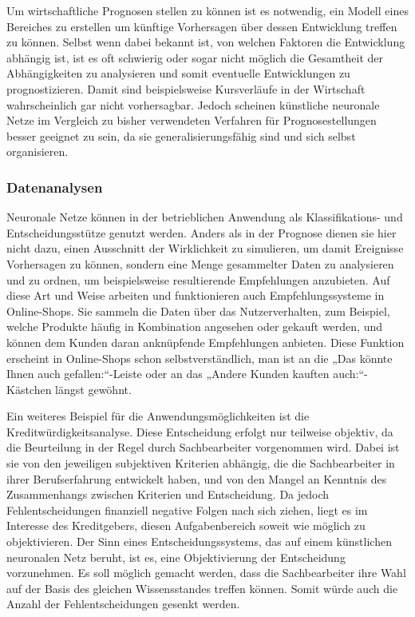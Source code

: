 \documentclass[twoside,a4paper,draft]{article}
\begin{document}
Um wirtschaftliche Prognosen stellen zu können ist es notwendig, ein Modell eines Bereiches zu erstellen um künftige Vorhersagen über dessen Entwicklung treffen zu können. Selbst wenn dabei bekannt ist, von welchen Faktoren die Entwicklung  abhängig ist, ist es oft schwierig oder sogar nicht möglich die Gesamtheit der Abhängigkeiten zu analysieren und somit eventuelle Entwicklungen zu prognostizieren. Damit sind beispielsweise Kursverläufe in der Wirtschaft wahrscheinlich gar nicht vorhersagbar. Jedoch scheinen künstliche neuronale Netze im Vergleich zu bisher verwendeten Verfahren für Prognosestellungen besser geeignet zu sein, da sie generalisierungsfähig sind und sich selbst organisieren.

\subsubsection{Datenanalysen}

Neuronale Netze können in der betrieblichen Anwendung als Klassifikations- und Entscheidungsstütze genutzt werden. Anders als in der Prognose dienen sie hier nicht dazu, einen Ausschnitt der Wirklichkeit zu simulieren, um damit Ereignisse Vorhersagen zu können, sondern eine Menge gesammelter Daten zu analysieren und zu ordnen, um beispielsweise resultierende Empfehlungen anzubieten. Auf diese Art und Weise arbeiten und funktionieren auch Empfehlungssysteme in Online-Shops. Sie sammeln die Daten über das Nutzerverhalten, zum Beispiel, welche Produkte häufig in Kombination angesehen oder gekauft werden, und können dem Kunden daran anknüpfende Empfehlungen anbieten. Diese Funktion erscheint in Online-Shops schon selbstverständlich, man ist an die „Das könnte Ihnen auch gefallen:“-Leiste oder an das „Andere Kunden kauften auch:“-Kästchen längst gewöhnt.

Ein weiteres Beispiel für die Anwendungsmöglichkeiten ist die Kreditwürdigkeitsanalyse. Diese Entscheidung erfolgt nur teilweise objektiv, da die Beurteilung in der Regel durch Sachbearbeiter vorgenommen wird. Dabei ist sie von den jeweiligen subjektiven Kriterien abhängig, die die Sachbearbeiter in ihrer Berufserfahrung entwickelt haben, und von den Mangel an Kenntnis des Zusammenhangs zwischen Kriterien und Entscheidung. Da jedoch Fehlentscheidungen finanziell negative Folgen nach sich ziehen, liegt es im Interesse des Kreditgebers, diesen Aufgabenbereich soweit wie möglich zu objektivieren. Der Sinn eines Entscheidungssystems, das auf einem künstlichen neuronalen Netz beruht, ist es, eine Objektivierung der Entscheidung vorzunehmen. Es soll möglich gemacht werden, dass die Sachbearbeiter ihre Wahl auf der Basis des gleichen Wissensstandes treffen können. Somit würde auch die Anzahl der Fehlentscheidungen gesenkt werden.
\end{document}
